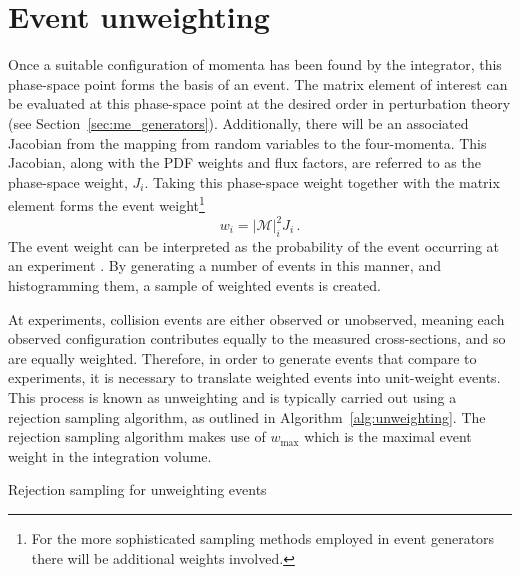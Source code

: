\documentclass[main.tex]{subfiles}
\begin{document}
    \section{Event unweighting}\label{sec:unweighting}
    Once a suitable configuration of momenta
    has been found by the integrator, this phase-space point forms the basis of an
    event. The matrix element of interest can be evaluated at
    this phase-space point at the desired order in perturbation
    theory (see Section~\ref{sec:me_generators}).
    Additionally, there will be an associated Jacobian
    from the mapping from random variables to the four-momenta.
    This Jacobian, along with the PDF weights and flux factors,
    are referred to as the phase-space weight, $J_{i}$. Taking
    this phase-space weight together
    with the matrix element forms the event weight\footnote{For
    the more sophisticated sampling methods employed in event generators
    there will be additional weights involved.}
    \begin{equation}\label{eqn:event_weight}
        w_{i} = |\mathcal{M}|_{i}^{2} J_{i} \, .
    \end{equation}
    The event weight can be interpreted as the probability
    of the event occurring at an experiment \cite{Plehn:2009nd}.
    By generating a number of events in this manner,
    and histogramming them, a sample of weighted events is created.
    
    At experiments, collision events are either observed or unobserved,
    meaning each observed configuration contributes equally to
    the measured cross-sections, and so are equally weighted.
    Therefore, in order to generate events that
    compare to experiments, it is necessary to translate
    weighted events into unit-weight events.
    This process is known as unweighting and is typically
    carried out using a rejection sampling algorithm, as
    outlined in Algorithm~\ref{alg:unweighting}. The rejection
    sampling algorithm makes use of $w_{\mathrm{max}}$ which is the
    maximal event weight in the integration volume.

    \begin{algorithm}
        \caption{Rejection sampling for unweighting events}\label{alg:unweighting}
    \end{algorithm}
\end{document}

